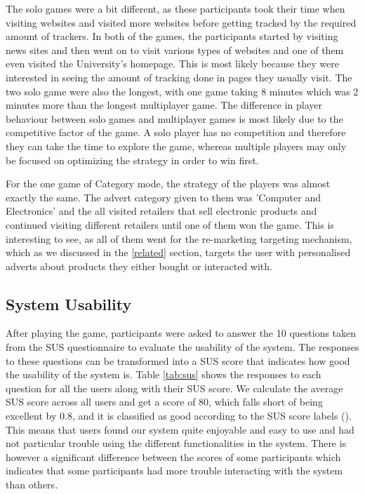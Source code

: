 \documentclass{l4proj}
\begin{document}
The solo games were a bit different, as these participants took their time when visiting websites and visited more websites before getting tracked by the required amount of trackers. In both of the games, the participants started by visiting news sites and then went on to visit various types of websites and one of them even visited the University's homepage. This is most likely because they were interested in seeing the amount of tracking done in pages they usually visit. The two solo game were also the longest, with one game taking 8 minutes which was 2 minutes more than the longest multiplayer game.
The difference in player behaviour between solo games and multiplayer games is most likely due to the competitive factor of the game. A solo player has no competition and therefore they can take the time to explore the game, whereas multiple players may only be focused on optimizing the strategy in order to win first. 

For the one game of Category mode, the strategy of the players was almost exactly the same. The advert category given to them was 'Computer and Electronics' and the all visited retailers that sell electronic products and continued visiting different retailers until one of them won the game. This is interesting to see, as all of them went for the re-marketing targeting mechanism, which as we discussed in the \ref{related} section, targets the user with personalised adverts about products they either bought or interacted with.

\subsection{System Usability}
After playing the game, participants were asked to answer the 10 questions taken from the SUS questionnaire to evaluate the usability of the system. The responses to these questions can be transformed into a SUS score that indicates how good the usability of the system is. Table \ref{tab:sus} shows the responses to each question for all the users along with their SUS score. We calculate the average SUS score across all users and get a score of 80, which falls short of being excellent by 0.8, and it is classified as good according to the SUS score labels (\cite{susscore}). This means that users found our system quite enjoyable and easy to use and had not particular trouble using the different functionalities in the system. There is however a significant difference between the scores of some participants which indicates that some participants had more trouble interacting with the system than others.
\end{document}
